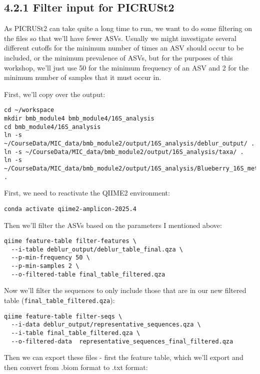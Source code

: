 \documentclass[
]{book}
\begin{document}
\subsection{4.2.1 Filter input for PICRUSt2}\label{filter-input-for-picrust2}

As PICRUSt2 can take quite a long time to run, we want to do some filtering on the files so that we'll have fewer ASVs. Usually we might investigate several different cutoffs for the minimum number of times an ASV should occur to be included, or the minimum prevalence of ASVs, but for the purposes of this workshop, we'll just use 50 for the minimum frequency of an ASV and 2 for the minimum number of samples that it must occur in.

First, we'll copy over the output:

\begin{verbatim}
cd ~/workspace
mkdir bmb_module4 bmb_module4/16S_analysis
cd bmb_module4/16S_analysis
ln -s ~/CourseData/MIC_data/bmb_module2/output/16S_analysis/deblur_output/ .
ln -s ~/CourseData/MIC_data/bmb_module2/output/16S_analysis/taxa/ .
ln -s ~/CourseData/MIC_data/bmb_module2/output/16S_analysis/Blueberry_16S_metadata.tsv .
\end{verbatim}

First, we need to reactivate the QIIME2 environment:

\begin{verbatim}
conda activate qiime2-amplicon-2025.4
\end{verbatim}

Then we'll filter the ASVs based on the parameters I mentioned above:

\begin{verbatim}
qiime feature-table filter-features \
  --i-table deblur_output/deblur_table_final.qza \
  --p-min-frequency 50 \
  --p-min-samples 2 \
  --o-filtered-table final_table_filtered.qza
\end{verbatim}

Now we'll filter the sequences to only include those that are in our new filtered table (\texttt{final\_table\_filtered.qza}):

\begin{verbatim}
qiime feature-table filter-seqs \
  --i-data deblur_output/representative_sequences.qza \
  --i-table final_table_filtered.qza \
  --o-filtered-data  representative_sequences_final_filtered.qza
\end{verbatim}

Then we can export these files - first the feature table, which we'll export and then convert from .biom format to .txt format:
\end{document}
